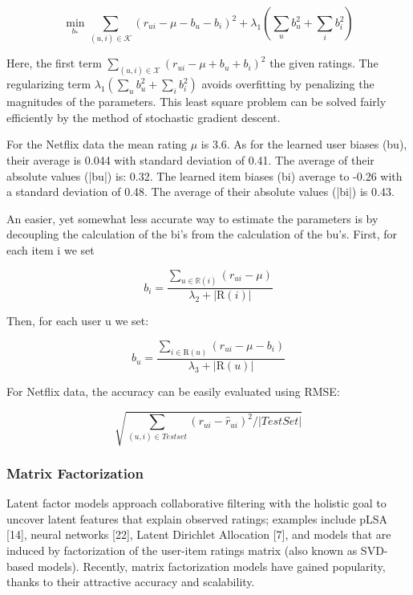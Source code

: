 $$
\min _ { b _ { * } } \sum _ { ( u , i ) \in \mathcal { K } } \left( r _ { u i } - \mu - b _ { u } - b _ { i } \right) ^ { 2 } + \lambda _ { 1 } \left( \sum _ { u } b _ { u } ^ { 2 } + \sum _ { i } b _ { i } ^ { 2 } \right)
$$

Here, the first term $\sum _ { ( u , i ) \in \mathcal { X } } \left( r _ { u i } - \mu + b _ { u } + b _ { i } \right) ^ { 2 }$ 
the given ratings. The regularizing term $\lambda _ { 1 } \left( \sum _ { u } b _ { u } ^ { 2 } + \sum _ { i } b _ { i } ^ { 2 } \right)$ avoids overfitting by penalizing the magnitudes of the parameters. This least square problem can be solved fairly efficiently by the method of stochastic gradient descent.

For the Netflix data the mean rating $\mu$ is 3.6. As for the learned user biases (bu), their average is 0.044 with standard deviation of 0.41. The average of their absolute values (|bu|) is: 0.32. The learned item biases (bi) average to -0.26 with a standard deviation of 0.48. The average of their absolute values (|bi|) is 0.43.

An easier, yet somewhat less accurate way to estimate the parameters is by decoupling the calculation of the bi’s from the calculation of the bu’s. First, for each item i we set

$$
b _ { i } = \frac { \sum _ { u \in \mathbb { R } ( i ) } \left( r _ { u i } - \mu \right) } { \lambda _ { 2 } + | \mathrm { R } ( i ) | }
$$

Then, for each user u we set:

$$b _ { u } = \frac { \sum _ { i \in \mathrm { R } ( u ) } \left( r _ { u i } - \mu - b _ { i } \right) } { \lambda _ { 3 } + | \mathrm { R } ( u ) | }$$

For Netflix data, the accuracy can be easily evaluated using RMSE:

$$
\sqrt { \sum _ { ( u , i ) \in T e s t s e t } \left( r _ { u i } - \hat { r } _ { u i } \right) ^ { 2 } / | T e s t S e t | }
$$

\subsubsection{Matrix Factorization}

Latent factor models approach collaborative filtering with the holistic goal to uncover latent features that explain observed ratings; examples include pLSA [14], neural networks [22], Latent Dirichlet Allocation [7], and models that are induced by factorization of the user-item ratings matrix (also known as SVD-based models). Recently, matrix factorization models have gained popularity, thanks to their attractive accuracy and scalability.

